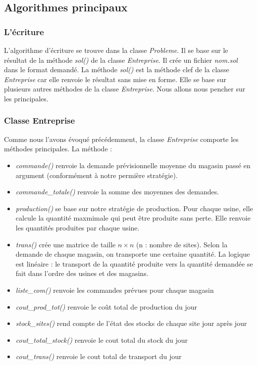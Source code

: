\documentclass[12pt, a4paper]{article}
\begin{document}
\subsection{Algorithmes principaux}

\subsubsection{L'écriture}
L'algorithme d'écriture se trouve dans la classe \emph{Probleme}. Il se base sur le résultat de la méthode \emph{sol()} de la classe \emph{Entreprise}. Il crée un fichier \emph{nom.sol} dans le format demandé. La méthode \emph{sol()} est la méthode clef de la classe \emph{Entreprise} car elle renvoie le résultat sans mise en forme. Elle se base sur plusieurs autres méthodes de la classe \emph{Entreprise}. Nous allons nous pencher sur les principales.

\subsubsection{Classe Entreprise}
Comme nous l'avons évoqué précédemment, la classe \emph{Entreprise} comporte les méthodes principales.
La méthode :
\begin{itemize}
\item \emph{commande()} renvoie la demande prévisionnelle moyenne du magasin passé en argument (conformément à notre permière stratégie).
\item \emph{commande\_totale()} renvoie la somme des moyennes des demandes.
\item \emph{production()} se base sur notre stratégie de production. Pour chaque usine, elle calcule la quantité maxmimale qui peut être produite sans perte. Elle renvoie les quantités produites par chaque usine.
\item \emph{trans()} crée une matrice de taille $n\times n$ (n : nombre de sites). Selon la demande de chaque magasin, on transporte une certaine quantité. La logique est linéaire : le transport de la quantité produite vers la quantité demandée se fait dans l'ordre des usines et des magasins.
\item \emph{liste\_com()} renvoie les commandes prévues pour chaque magasin
\item \emph{cout\_prod\_tot()} renvoie le coût total de production du jour
\item \emph{stock\_sites()} rend compte de l'état des stocks de chaque site jour après jour
\item \emph{cout\_total\_stock()} renvoie le cout total du stock du jour 
\item\emph{cout\_trans()} renvoie le cout total de transport du jour
\end{itemize}
\end{document}
